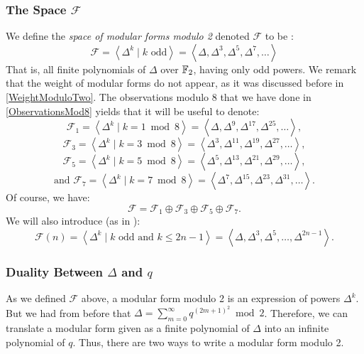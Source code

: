 \subsubsection{The Space $\mathcal{F}$}
\label{ModularFormsModTwo}
We define the \textit{space of modular forms modulo 2} denoted $\mathcal{F} $ to be \cite[2.1]{OrdreNilpotenceOperateurHecke}:
$$
\mathcal{F}
= \left\langle \Delta^k \mid k \text{ odd} \right\rangle
= \left\langle \Delta, \Delta^3, \Delta^5, \Delta^7, \dots \right\rangle 
$$
That is, all finite polynomials of $\Delta$ over $\mathbb{F}_2$, having only odd powers.
We remark that the weight of modular forms do not appear, as it was discussed before in \ref{WeightModuloTwo}.
The observations modulo 8 that we have done in \ref{ObservationsMod8} yields that it will be useful to denote:
$$
\mathcal{F}_1
= \left\langle \Delta^k \mid k = 1 \bmod 8 \right\rangle
= \left\langle \Delta, \Delta^9, \Delta^{17}, \Delta^{25}, \dots \right\rangle,
$$
$$
\mathcal{F}_3
= \left\langle \Delta^k \mid k = 3 \bmod 8 \right\rangle
= \left\langle \Delta^3, \Delta^{11}, \Delta^{19}, \Delta^{27}, \dots \right\rangle,
$$
$$
\mathcal{F}_5
= \left\langle \Delta^k \mid k = 5 \bmod 8 \right\rangle
= \left\langle \Delta^5, \Delta^{13}, \Delta^{21}, \Delta^{29}, \dots \right\rangle,
$$
$$
\text{and }
\mathcal{F}_7
= \left\langle \Delta^k \mid k = 7 \bmod 8 \right\rangle
= \left\langle \Delta^7, \Delta^{15}, \Delta^{23}, \Delta^{31}, \dots \right\rangle.
$$
Of course, we have:
$$
\mathcal{F} = \mathcal{F}_1 \oplus \mathcal{F}_3 \oplus \mathcal{F}_5 \oplus \mathcal{F}_7.
$$
We will also introduce (as in \cite[2.]{StructureAlgebreHecke}):
$$
\mathcal{F}(n)
= \left\langle \Delta^k \mid k \text{ odd} \text{ and } k \leq 2n-1 \right\rangle
= \left\langle \Delta, \Delta^3, \Delta^5, \dots, \Delta^{2n-1} \right\rangle.
$$

\subsubsection{Duality Between $\Delta$ and $q$}
As we defined $\mathcal{F}$ above, a modular form modulo 2 is an expression of powers $\Delta^k$.
But we had from before that $\Delta = \sum_{m=0}^{\infty} q^{(2m+1)^2} \bmod 2$.
Therefore, we can translate a modular form given as a finite polynomial of $\Delta$ into an infinite polynomial of $q$.
Thus, there are two ways to write a modular form modulo 2.

